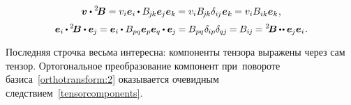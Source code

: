 \begin{otherlanguage}{russian}
\nopagebreak\vspace{-0.1em}\begin{equation*}
\bm{v} \dotp {^2\!\bm{B}} =
v_i\bm{e}_i \hspace{-0.1ex} \dotp B_{\hspace{-0.2ex}j\hspace{-0.1ex}k}\bm{e}_{\hspace{-0.1ex}j} \bm{e}_k \hspace{-0.1ex} =
v_i B_{\hspace{-0.2ex}j\hspace{-0.1ex}k} \delta_{i\hspace{-0.1ex}j} \hspace{.1ex} \bm{e}_k \hspace{-0.1ex} =
v_i B_{ik} \bm{e}_k
\hspace{.1ex} ,
\end{equation*}\vspace{-1.25em}
\begin{equation}\label{tensorcomponents}
\bm{e}_i \hspace{-0.1ex} \dotp \hspace{-0.1ex} {^2\!\bm{B}} \dotp \bm{e}_{\hspace{-0.1ex}j} \hspace{-0.1ex} =
\bm{e}_i \hspace{-0.1ex} \dotp B_{pq}\bm{e}_p\bm{e}_q \hspace{-0.1ex} \dotp \bm{e}_{\hspace{-0.1ex}j} \hspace{-0.15ex} =
\hspace{-0.1ex} B_{pq} \hspace{.1ex} \delta_{\hspace{-0.1ex}ip} \delta_{\hspace{-0.1ex}qj} \hspace{-0.15ex} =
\hspace{-0.1ex} B_{i\hspace{-0.1ex}j} \hspace{-0.15ex} =
{^2\!\bm{B}} \hspace{-0.1ex} \dotdotp \bm{e}_{\hspace{-0.1ex}j} \bm{e}_i
\hspace{.1ex} .
\end{equation}

Последняя строчка весьма интересна: компоненты тензора выражены через сам тензор. Ортогональное преобразование компонент при~повороте базиса~\eqref{orthotransform:2} оказывается очевидным следствием~\eqref{tensorcomponents}.


\end{otherlanguage}
